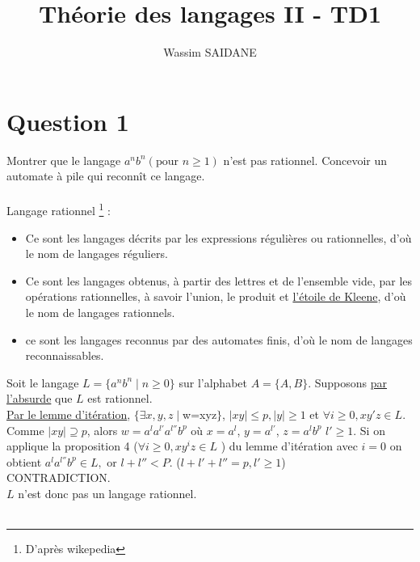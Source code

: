 \documentclass{article}
\title{Théorie des langages II - TD1}
\author{Wassim SAIDANE}
\date{}
\begin{document}
    \maketitle
    \section*{Question 1}
    Montrer  que  le  langage $a^nb^n(\text{pour } n \ge 1)$  n’est  pas  rationnel.  Concevoir  un automate à pile qui reconnît ce langage. \\
    \\
    Langage rationnel \footnote{D'après wikepedia} : \\
    \begin{itemize}
        \item Ce sont les langages décrits par les expressions régulières ou rationnelles, d'où le nom de langages réguliers.
        \item Ce sont les langages obtenus, à partir des lettres et de l'ensemble vide, par les opérations rationnelles, à savoir l'union, le produit et \href{https://fr.wikipedia.org/wiki/Étoile_de_Kleene}{l'étoile de Kleene}, d'où le nom de langages rationnels.
        \item ce sont les langages reconnus par des automates finis, d'où le nom de langages reconnaissables.
    \end{itemize} 
    Soit le langage $L=\{a^nb^n \mid n \ge 0\}$ sur l'alphabet $A=\{A,B\}$. Supposons \underline{par l'absurde} que $L$ est rationnel. \\
    \href{https://fr.wikipedia.org/wiki/Lemme_de_l%27étoile}{\underline{Par le lemme d'itération}}, $\{\exists x,y,z \mid $w=xyz$\}$, $\mid xy \mid \le p, \mid y \mid \ge 1$ 
    et $\forall i \ge 0, xy'z \in L$. \\
    Comme $\mid xy \mid \supseteq p$, alors $w=a^la^{l'}a^{l''}b^p$ où $x=a^l$, $y=a^{l'}$, $z=a^lb^p$ $l' \ge 1$. Si on applique la proposition 4 ($\forall i \ge 0, xy^iz \in L$ )
    du lemme d'itération avec $i=0$ on obtient $a^la^{l''}b^p \in L,$ or $l+l'' < P$. ($l+l'+l''=p, l' \ge 1$) \\
    CONTRADICTION. \\
    $L$ n'est donc pas un langage rationnel. \\
    \\
\end{document}
